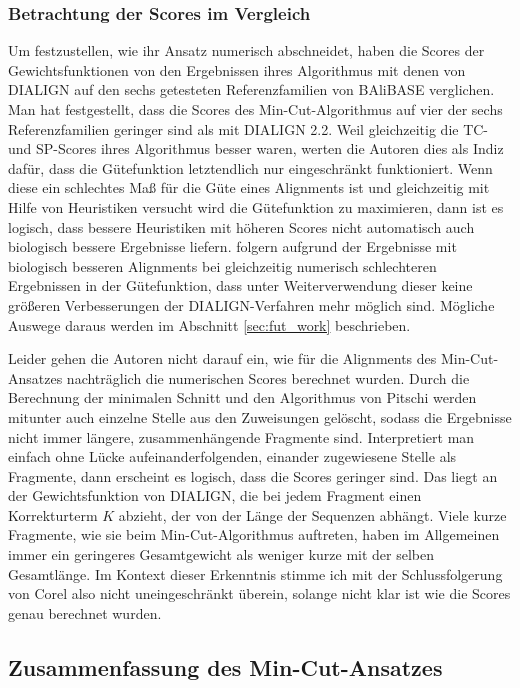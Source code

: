 \subsubsection{Betrachtung der Scores im Vergleich}

Um festzustellen, wie ihr Ansatz numerisch abschneidet, haben \cite{cpm10} die Scores der Gewichtsfunktionen von den Ergebnissen ihres Algorithmus mit denen von DIALIGN auf den sechs getesteten Referenzfamilien von BAliBASE verglichen. Man hat festgestellt, dass die Scores des Min-Cut-Algorithmus auf vier der sechs Referenzfamilien geringer sind als mit DIALIGN 2.2. Weil gleichzeitig die TC- und SP-Scores ihres Algorithmus besser waren, werten die Autoren dies als Indiz dafür, dass die Gütefunktion letztendlich nur eingeschränkt funktioniert. Wenn diese ein schlechtes Maß für die Güte eines Alignments ist und gleichzeitig mit Hilfe von Heuristiken versucht wird die Gütefunktion zu maximieren, dann ist es logisch, dass bessere Heuristiken mit höheren Scores nicht automatisch auch biologisch bessere Ergebnisse liefern. \cite{cpm10} folgern aufgrund der Ergebnisse mit biologisch besseren Alignments bei gleichzeitig numerisch schlechteren Ergebnissen in der Gütefunktion, dass unter Weiterverwendung dieser keine größeren Verbesserungen der DIALIGN-Verfahren mehr möglich sind. Mögliche Auswege daraus werden im Abschnitt \ref{sec:fut_work} beschrieben.

Leider gehen die Autoren nicht darauf ein, wie für die Alignments des Min-Cut-Ansatzes nachträglich die numerischen Scores berechnet wurden. Durch die Berechnung der minimalen Schnitt und den Algorithmus von Pitschi werden mitunter auch einzelne Stelle aus den Zuweisungen gelöscht, sodass die Ergebnisse nicht immer längere, zusammenhängende Fragmente sind. Interpretiert man einfach ohne Lücke aufeinanderfolgenden, einander zugewiesene Stelle als Fragmente, dann erscheint es logisch, dass die Scores geringer sind. Das liegt an der Gewichtsfunktion von DIALIGN, die bei jedem Fragment einen Korrekturterm $K$ abzieht, der von der Länge der Sequenzen abhängt. Viele kurze Fragmente, wie sie beim Min-Cut-Algorithmus auftreten, haben im Allgemeinen immer ein geringeres Gesamtgewicht als weniger kurze mit der selben Gesamtlänge. Im Kontext dieser Erkenntnis stimme ich mit der Schlussfolgerung von Corel also nicht uneingeschränkt überein, solange nicht klar ist wie die Scores genau berechnet wurden.

\subsection{Zusammenfassung des Min-Cut-Ansatzes}

